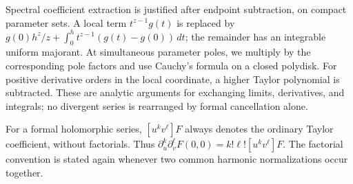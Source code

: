 Spectral coefficient extraction is justified after endpoint subtraction,
on compact parameter sets.  A local term $t^{z-1}g(t)$ is replaced by
$g(0)h^z/z+\int_0^h t^{z-1}(g(t)-g(0))\,dt$; the remainder has an
integrable uniform majorant.  At simultaneous parameter poles, we
multiply by the corresponding pole factors and use Cauchy's formula
on a closed polydisk.  For positive derivative orders in the local
coordinate, a higher Taylor polynomial is subtracted.  These are
analytic arguments for exchanging limits, derivatives, and integrals;
no divergent series is rearranged by formal cancellation alone.

For a formal holomorphic series, $[u^kv^\ell]F$ always denotes the
ordinary Taylor coefficient, without factorials.  Thus
$\partial_u^k\partial_v^\ell F(0,0)=k!\ell![u^kv^\ell]F$.
The factorial convention is stated again whenever two common harmonic
normalizations occur together.
